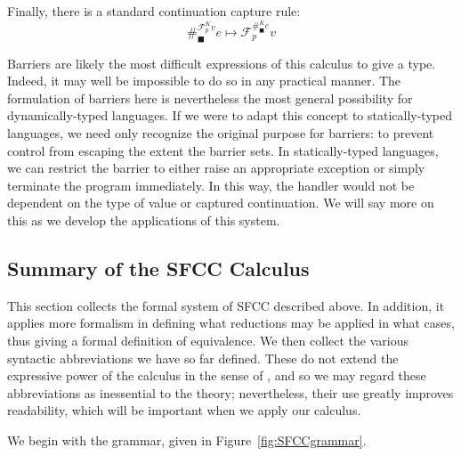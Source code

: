 \documentclass[11pt]{article}
\newcommand{\maybePage}{\null}
\newcommand\F{\mathcal{F}}
\begin{document}
Finally, there is a standard continuation capture rule:
$$\#_\blacksquare^{\F_p^K v}e \mapsto \F_p^{\#_\blacksquare^K e}v$$

Barriers are likely the most difficult expressions of this calculus to give a type.
Indeed, it may well be impossible to do so in any practical manner.
The formulation of barriers here is nevertheless the most general possibility for dynamically-typed languages.
If we were to adapt this concept to statically-typed languages, we need only recognize the original purpose for barriers: to prevent control from escaping the extent the barrier sets.
In statically-typed languages, we can restrict the barrier to either raise an appropriate exception or simply terminate the program immediately.
In this way, the handler would not be dependent on the type of value or captured continuation.
We will say more on this as we develop the applications of this system.

\maybePage
\subsection{Summary of the SFCC Calculus}
\label{subsec:summarySFCCcalculus}

This section collects the formal system of SFCC described above.
In addition, it applies more formalism in defining what reductions may be applied in what cases, thus giving a formal definition of equivalence.
We then collect the various syntactic abbreviations we have so far defined.
These do not extend the expressive power of the calculus in the sense of \cite{Felleisen90expressive}, and so we may regard these abbreviations as inessential to the theory;
nevertheless, their use greatly improves readability, which will be important when we apply our calculus.

We begin with the grammar, given in Figure~\ref{fig:SFCCgrammar}.
\end{document}
